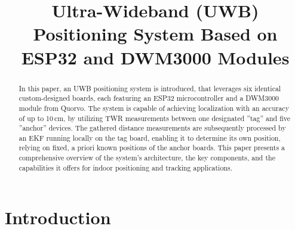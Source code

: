 \documentclass[final, conference, a4paper]{IEEEtran}
\begin{document}
\renewcommand{\baselinestretch}{0.97} %

\title{Ultra-Wideband (UWB) Positioning System Based on ESP32 and DWM3000 Modules}

\author{
	\and
}

\maketitle

\begin{abstract}
  In this paper, an \ac{UWB} positioning system is introduced, that leverages six identical custom-designed boards, each featuring an ESP32 microcontroller and a DWM3000 module from Quorvo.
  \newline
  The system is capable of achieving localization with an accuracy of up to 10\,cm, by utilizing \ac{TWR} measurements between one designated ''tag'' and five ''anchor'' devices.
  The gathered distance measurements are subsequently processed by an \ac{EKF} running locally on the tag board, enabling it to determine its own position,
  relying on fixed, a priori known positions of the anchor boards.
  \newline
  This paper presents a comprehensive overview of the system's architecture, the key components, and the capabilities it offers for indoor positioning and tracking applications.
\end{abstract}


\IEEEpeerreviewmaketitle


\section{Introduction}
\label{sec:Introduction}
\end{document}
